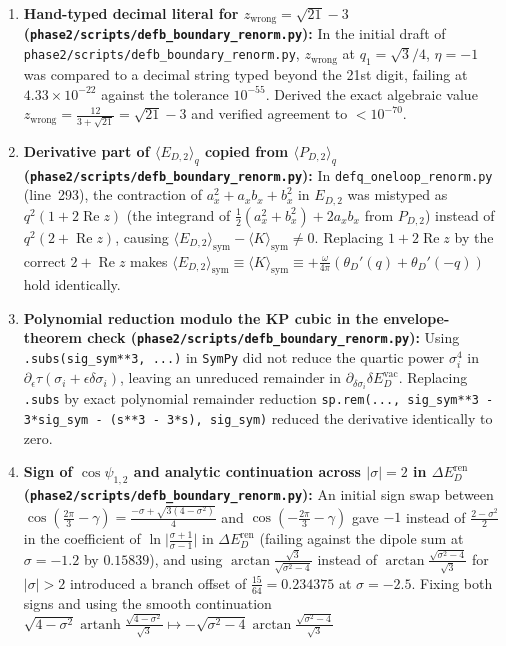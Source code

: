 \documentclass[11pt,a4paper]{article}
\theoremstyle{remark}
\newcommand{\Rea}{\operatorname{Re}}
\newcommand{\artanh}{\operatorname{artanh}}
\newcommand{\sren}{\texttt{phase2/\allowbreak scripts/\allowbreak defb\_\allowbreak boundary\_\allowbreak renorm.py}}
\begin{document}
\begin{enumerate}
\item \textbf{Hand-typed decimal literal for $z_{\mathrm{wrong}} = \sqrt{21}-3$ (\sren):}
In the initial draft of \sren, $z_{\mathrm{wrong}}$ at $q_1=\sqrt{3}/4$, $\eta=-1$
was compared to a decimal string typed beyond the 21st digit, failing at
$4.33\times 10^{-22}$ against the tolerance $10^{-55}$. Derived the exact
algebraic value $z_{\mathrm{wrong}} = \frac{12}{3+\sqrt{21}} = \sqrt{21}-3$ and
verified agreement to $<10^{-70}$.
\item \textbf{Derivative part of $\langle E_{D,2}\rangle_q$ copied from $\langle P_{D,2}\rangle_q$ (\sren):}
In \texttt{defq\_oneloop\_renorm.py} (line~293), the contraction of
$a_x^2 + a_x b_x + b_x^2$ in $E_{D,2}$ was mistyped as $q^2(1+2\Rea z)$ (the
integrand of $\frac{1}{2}(a_x^2+b_x^2)+2a_x b_x$ from $P_{D,2}$) instead of
$q^2(2+\Rea z)$, causing $\langle E_{D,2}\rangle_{\mathrm{sym}} - \langle K\rangle_{\mathrm{sym}} \ne 0$.
Replacing $1+2\Rea z$ by the correct $2+\Rea z$ makes
$\langle E_{D,2}\rangle_{\mathrm{sym}} \equiv \langle K\rangle_{\mathrm{sym}} \equiv +\frac{\omega}{4\pi}(\theta_D'(q)+\theta_D'(-q))$
hold identically.
\item \textbf{Polynomial reduction modulo the KP cubic in the envelope-theorem check (\sren):}
Using \texttt{.subs(sig\_sym**3, ...)} in \texttt{SymPy} did not reduce the
quartic power $\sigma_i^4$ in $\partial_\epsilon\tau(\sigma_i+\epsilon\delta\sigma_i)$,
leaving an unreduced remainder in $\partial_{\delta\sigma_i}\delta E_D^{\mathrm{vac}}$.
Replacing \texttt{.subs} by exact polynomial remainder reduction
\texttt{sp.rem(..., sig\_sym**3 - 3*sig\_sym - (s**3 - 3*s), sig\_sym)} reduced
the derivative identically to zero.
\item \textbf{Sign of $\cos\psi_{1,2}$ and analytic continuation across $|\sigma|=2$ in $\Delta E_D^{\mathrm{ren}}$ (\sren):}
An initial sign swap between $\cos(\frac{2\pi}{3}-\gamma) = \frac{-\sigma+\sqrt{3(4-\sigma^2)}}{4}$
and $\cos(-\frac{2\pi}{3}-\gamma)$ gave $-1$ instead of $\frac{2-\sigma^2}{2}$
in the coefficient of $\ln\big|\frac{\sigma+1}{\sigma-1}\big|$ in
$\Delta E_D^{\mathrm{ren}}$ (failing against the dipole sum at $\sigma=-1.2$ by
$0.15839$), and using $\arctan\frac{\sqrt{3}}{\sqrt{\sigma^2-4}}$ instead of
$\arctan\frac{\sqrt{\sigma^2-4}}{\sqrt{3}}$ for $|\sigma|>2$ introduced a
branch offset of $\frac{15}{64} = 0.234375$ at $\sigma=-2.5$. Fixing both signs
and using the smooth continuation
$\sqrt{4-\sigma^2}\artanh\frac{\sqrt{4-\sigma^2}}{\sqrt{3}} \mapsto -\sqrt{\sigma^2-4}\arctan\frac{\sqrt{\sigma^2-4}}{\sqrt{3}}$

\end{enumerate}
\end{document}
